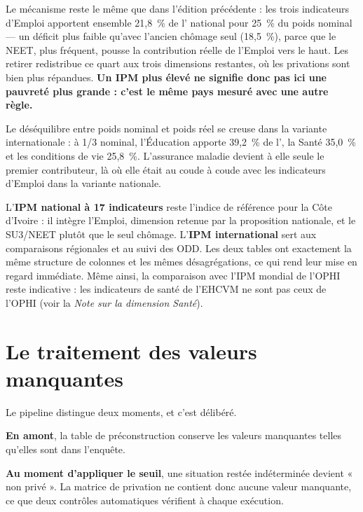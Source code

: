 \documentclass[11pt,a4paper]{article}
\begin{document}
\begin{attention}
Le mécanisme reste le même que dans l'édition précédente : les trois indicateurs d'Emploi
apportent ensemble 21,8~\% de l'\ipm{} national pour 25~\% du poids nominal --- un déficit plus
faible qu'avec l'ancien chômage seul (18,5~\%), parce que le NEET, plus fréquent, pousse la
contribution réelle de l'Emploi vers le haut. Les retirer redistribue ce quart aux trois
dimensions restantes, où les privations sont bien plus répandues. \textbf{Un IPM plus élevé ne
signifie donc pas ici une pauvreté plus grande : c'est le même pays mesuré avec une autre règle.}
\end{attention}

Le déséquilibre entre poids nominal et poids réel se creuse dans la variante internationale : à
1/3 nominal, l'Éducation apporte 39,2~\% de l'\ipm{}, la Santé 35,0~\% et les conditions de vie
25,8~\%. L'assurance maladie devient à elle seule le premier contributeur, là où elle était au
coude à coude avec les indicateurs d'Emploi dans la variante nationale.

\begin{retenir}
L'\textbf{IPM national à 17 indicateurs} reste l'indice de référence pour la Côte d'Ivoire : il
intègre l'Emploi, dimension retenue par la proposition nationale, et le SU3/NEET plutôt que le
seul chômage. L'\textbf{IPM international} sert aux comparaisons régionales et au suivi des ODD.
Les deux tables ont exactement la même structure de colonnes et les mêmes désagrégations, ce qui
rend leur mise en regard immédiate. Même ainsi, la comparaison avec l'IPM mondial de l'OPHI reste
indicative : les indicateurs de santé de l'EHCVM ne sont pas ceux de l'OPHI (voir la \emph{Note
sur la dimension Santé}).
\end{retenir}

\section{Le traitement des valeurs manquantes}

Le pipeline distingue deux moments, et c'est délibéré.

\textbf{En amont}, la table de préconstruction conserve les valeurs manquantes telles qu'elles
sont dans l'enquête.

\textbf{Au moment d'appliquer le seuil}, une situation restée indéterminée devient « non privé ».
La matrice de privation ne contient donc aucune valeur manquante, ce que deux contrôles
automatiques vérifient à chaque exécution.
\end{document}
